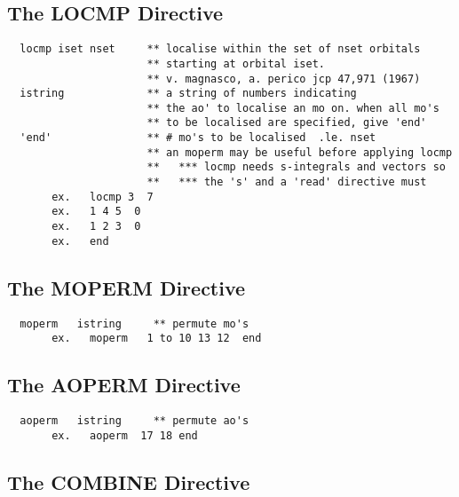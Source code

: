 \documentclass[11pt,fleqn]{article}
\begin{document}
\subsection{The LOCMP Directive}

{
\footnotesize
\begin{verbatim} 
  locmp iset nset     ** localise within the set of nset orbitals
                      ** starting at orbital iset.
                      ** v. magnasco, a. perico jcp 47,971 (1967)
  istring             ** a string of numbers indicating
                      ** the ao' to localise an mo on. when all mo's
                      ** to be localised are specified, give 'end'
  'end'               ** # mo's to be localised  .le. nset
                      ** an moperm may be useful before applying locmp
                      **   *** locmp needs s-integrals and vectors so
                      **   *** the 's' and a 'read' directive must
       ex.   locmp 3  7
       ex.   1 4 5  0
       ex.   1 2 3  0
       ex.   end
\end{verbatim}
}

\subsection{The MOPERM Directive}

{
\footnotesize
\begin{verbatim} 
  moperm   istring     ** permute mo's
       ex.   moperm   1 to 10 13 12  end
\end{verbatim}
}

\subsection{The AOPERM Directive}

{
\footnotesize
\begin{verbatim} 
  aoperm   istring     ** permute ao's
       ex.   aoperm  17 18 end
\end{verbatim}
}

\subsection{The COMBINE Directive}
\end{document}
